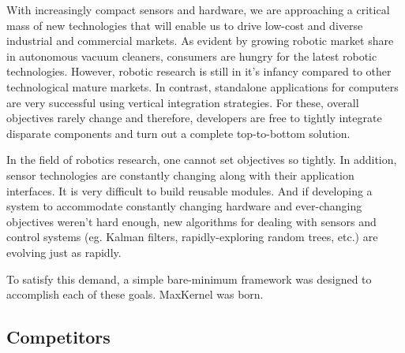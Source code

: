  With increasingly compact sensors and hardware, we are approaching a critical mass of new technologies that will enable us to drive low-cost and diverse industrial and commercial markets. As evident by growing robotic market share in autonomous vacuum cleaners, consumers are hungry for the latest robotic technologies. However, robotic research is still in it's infancy compared to other technological mature markets. In contrast, standalone applications for computers are very successful using vertical integration strategies. For these, overall objectives rarely change and therefore, developers are free to tightly integrate disparate components and turn out a complete top-to-bottom solution.

In the field of robotics research, one cannot set objectives so tightly. In addition, sensor technologies are constantly changing along with their application interfaces. It is very difficult to build reusable modules. And if developing a system to accommodate constantly changing hardware and ever-changing objectives weren't hard enough, new algorithms for dealing with sensors and control systems (eg. Kalman filters, rapidly-exploring random trees, etc.) are evolving just as rapidly.

To satisfy this demand, a simple bare-minimum framework was designed to accomplish each of these goals. MaxKernel was born.


\subsection{Competitors}


